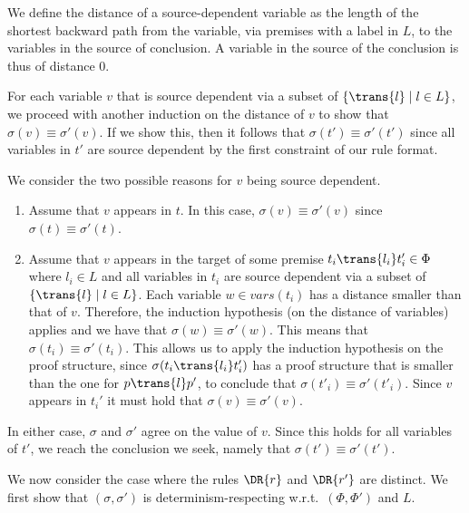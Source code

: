 
We define the distance of a source-dependent variable as the length of the shortest backward path from the variable, via premises with a label in $L$, to the variables in the source of conclusion. A variable in the source of the conclusion is thus of distance 0.

For each variable $v$ that is source dependent via  a subset of $\{ \trans{l} \mid l \in  L\}$, we proceed with another induction
on the distance of $v$ to show that $\sigma(v) \equiv \sigma'(v)$. If we show this, then it follows that $\sigma(t') \equiv \sigma'(t')$ since
all variables in $t'$ are source dependent by the first constraint of our rule format.

We consider the two possible reasons for $v$ being source dependent.
\begin{enumerate}
    \item Assume that $v$ appears in $t$. In this case, $\sigma(v)\equiv\sigma'(v)$ since $\sigma(t)\equiv\sigma'(t)$.
    \item Assume that $v$ appears in the target of some premise $t_i \trans{l_i} t_i' \in \Phi$ where $l_i \in L$
          and all variables in $t_i$ are source dependent via  a subset of $\{ \trans{l} \mid l \in  L\}$.
          Each variable $w \in vars(t_i)$ has a distance smaller than that of $v$. Therefore, the induction
          hypothesis (on the distance of variables) applies and we have that $\sigma(w) \equiv\sigma'(w)$.
          This means that $\sigma(t_i)\equiv\sigma'(t_i)$. This allows
          us to apply the induction hypothesis on the proof structure, since $\sigma(t_i \trans{l_i} t_i')$ has a proof structure
          that is smaller than the one for $p \trans{l} p'$, to conclude that $\sigma(t'_i) \equiv \sigma'(t'_i)$.
          Since $v$ appears in $t_i'$ it must hold that $\sigma(v)\equiv\sigma'(v)$.
\end{enumerate}
In either case, $\sigma$ and $\sigma'$ agree on the value of $v$. Since this holds for all variables of $t'$,
we reach the conclusion we seek, namely that $\sigma(t')\equiv\sigma'(t')$.

We now consider the case where the rules $\DR{r}$ and $\DR{r'}$ are distinct.
We first show that $(\sigma, \sigma')$ is determinism-respecting w.r.t.\ $(\Phi, \Phi')$ and $L$.

